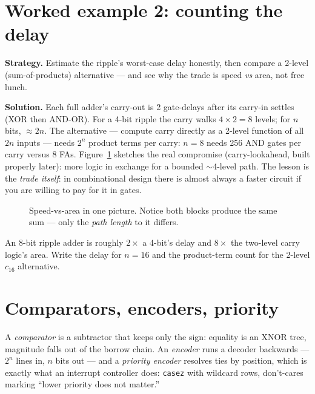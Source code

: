 \section{Worked example 2: counting the delay}
\label{sec:we-delay}

\textbf{Strategy.} Estimate the ripple's worst-case delay honestly, then
compare a 2-level (sum-of-products) alternative — and see why the trade
is speed \emph{vs} area, not free lunch.

\textbf{Solution.} Each full adder's carry-out is 2 gate-delays after its
carry-in settles (XOR then AND-OR). For a 4-bit ripple the carry walks
$4\times 2=8$ levels; for $n$ bits, $\approx 2n$. The alternative —
compute carry directly as a 2-level function of all $2n$ inputs — needs
$2^n$ product terms per carry: $n=8$ needs 256 AND gates per carry
versus 8 FAs. Figure~\ref{fig:adderblock} sketches the real compromise
(carry-lookahead, built properly later): more logic in exchange for a
bounded $\sim$4-level path. The lesson is the \emph{trade itself}: in
combinational design there is almost always a faster circuit if you are
willing to pay for it in gates.

\begin{figure}[htbp]
\centering

\caption{Speed-vs-area in one picture. Notice both blocks produce the
same sum — only the \emph{path length} to it differs.}
\label{fig:adderblock}
\end{figure}

\begin{exercise}[medium]
An 8-bit ripple adder is roughly $2\times$ a 4-bit's delay and $8\times$
the two-level carry logic's area. Write the delay for $n=16$ and the
product-term count for the 2-level $c_{16}$ alternative.
\end{exercise}

\section{Comparators, encoders, priority}
\label{sec:priority}

A \emph{comparator} is a subtractor that
keeps only the sign: equality is an XNOR tree, magnitude falls out of
the borrow chain. An \emph{encoder} runs a decoder
backwards — $2^n$ lines in, $n$ bits out — and a \emph{priority
encoder} resolves ties by position, which is exactly what an interrupt
controller does: \texttt{casez} with wildcard rows, don't-cares marking
``lower priority does not matter.''

